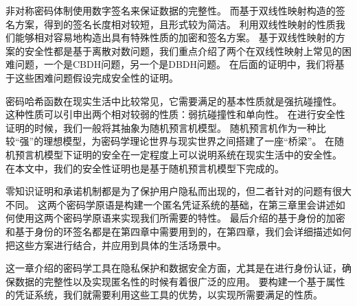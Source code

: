 非对称密码体制使用数字签名来保证数据的完整性。
而基于双线性映射构造的签名方案，得到的签名长度相对较短，且形式较为简洁。
利用双线性映射的性质我们能够相对容易地构造出具有特殊性质的加密和签名方案。
基于双线性映射的方案的安全性都是基于离散对数问题，我们重点介绍了两个在双线性映射上常见的困难问题，一个是CBDH问题，另一个是DBDH问题。
在后面的证明中，我们将基于这些困难问题假设完成安全性的证明。

密码哈希函数在现实生活中比较常见，它需要满足的基本性质就是强抗碰撞性。
这种性质可以引申出两个相对较弱的性质：弱抗碰撞性和单向性。
在进行安全性证明的时候，我们一般将其抽象为随机预言机模型。
随机预言机作为一种比较“强”的理想模型，为密码学理论世界与现实世界之间搭建了一座“桥梁”。
在随机预言机模型下证明的安全在一定程度上可以说明系统在现实生活中的安全性。
在本文中，我们的安全性证明也是基于随机预言机模型下完成的。

零知识证明和承诺机制都是为了保护用户隐私而出现的，但二者针对的问题有很大不同。
这两个密码学原语是构建一个匿名凭证系统的基础，在第三章里会讲述如何使用这两个密码学原语来实现我们所需要的特性。
最后介绍的基于身份的加密和基于身份的环签名都是在第四章中需要用到的，在第四章，我们会详细描述如何把这些方案进行结合，并应用到具体的生活场景中。

这一章介绍的密码学工具在隐私保护和数据安全方面，尤其是在进行身份认证，确保数据的完整性以及实现匿名性的时候有着很广泛的应用。
要构建一个基于属性的凭证系统，我们就需要利用这些工具的优势，以实现所需要满足的性质。